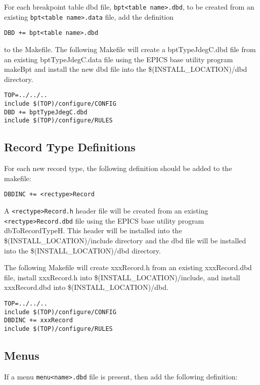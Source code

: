 For each breakpoint table dbd file, \verb|bpt<table name>.dbd|, to be created from an existing \verb|bpt<table name>.data| file, add the 
definition

\begin{verbatim}
DBD += bpt<table name>.dbd
\end{verbatim}

to the Makefile. The following Makefile will create a bptTypeJdegC.dbd file from an existing bptTypeJdegC.data file 
using the EPICS base utility program makeBpt and install the new dbd file into the \$(INSTALL\_LOCATION)/dbd 
directory.

\begin{verbatim}
TOP=../../..
include $(TOP)/configure/CONFIG
DBD += bptTypeJdegC.dbd
include $(TOP)/configure/RULES
\end{verbatim}

\subsection{Record Type Definitions}

For each new record type, the following definition should be added to the makefile:

\begin{verbatim}
DBDINC += <rectype>Record
\end{verbatim}

A \verb|<rectype>Record.h| header file will be created from an existing \verb|<rectype>Record.dbd| file using the EPICS base utility 
program dbToRecordTypeH. This header will be installed into the \$(INSTALL\_LOCATION)/include directory and the 
dbd file will be installed into the \$(INSTALL\_LOCATION)/dbd directory.

The following Makefile will create xxxRecord.h from an existing xxxRecord.dbd file, install xxxRecord.h into 
\$(INSTALL\_LOCATION)/include, and install xxxRecord.dbd into \$(INSTALL\_LOCATION)/dbd.

\begin{verbatim}
TOP=../../..
include $(TOP)/configure/CONFIG
DBDINC += xxxRecord
include $(TOP)/configure/RULES
\end{verbatim}

\subsection{Menus}

If a menu \verb|menu<name>.dbd| file is present, then add the following definition:

